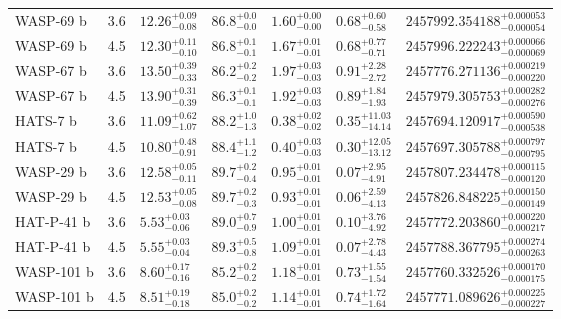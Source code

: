 {\begin{longtable}[h]{lllllll}
WASP-69 b   &               3.6 &  ${12.26}^{+0.09}_{-0.08}$ &  ${86.8}^{+0.0}_{-0.0}$ &  ${1.60}^{+0.00}_{-0.00}$ &    ${0.68}^{+0.60}_{-0.58}$ &  ${2457992.354188}^{+0.000053}_{-0.000054}$ \\
WASP-69 b   &               4.5 &  ${12.30}^{+0.11}_{-0.10}$ &  ${86.8}^{+0.1}_{-0.1}$ &  ${1.67}^{+0.01}_{-0.01}$ &    ${0.68}^{+0.77}_{-0.71}$ &  ${2457996.222243}^{+0.000066}_{-0.000069}$ \\
WASP-67 b   &               3.6 &  ${13.50}^{+0.39}_{-0.33}$ &  ${86.2}^{+0.2}_{-0.2}$ &  ${1.97}^{+0.03}_{-0.03}$ &    ${0.91}^{+2.28}_{-2.72}$ &  ${2457776.271136}^{+0.000219}_{-0.000220}$ \\
WASP-67 b   &               4.5 &  ${13.90}^{+0.31}_{-0.39}$ &  ${86.3}^{+0.1}_{-0.1}$ &  ${1.92}^{+0.03}_{-0.03}$ &    ${0.89}^{+1.84}_{-1.93}$ &  ${2457979.305753}^{+0.000282}_{-0.000276}$ \\
HATS-7 b    &               3.6 &  ${11.09}^{+0.62}_{-1.07}$ &  ${88.2}^{+1.0}_{-1.3}$ &  ${0.38}^{+0.02}_{-0.02}$ &  ${0.35}^{+11.03}_{-14.14}$ &  ${2457694.120917}^{+0.000590}_{-0.000538}$ \\
HATS-7 b    &               4.5 &  ${10.80}^{+0.48}_{-0.91}$ &  ${88.4}^{+1.1}_{-1.2}$ &  ${0.40}^{+0.03}_{-0.03}$ &  ${0.30}^{+12.05}_{-13.12}$ &  ${2457697.305788}^{+0.000797}_{-0.000795}$ \\
WASP-29 b   &               3.6 &  ${12.58}^{+0.05}_{-0.11}$ &  ${89.7}^{+0.2}_{-0.4}$ &  ${0.95}^{+0.01}_{-0.01}$ &    ${0.07}^{+2.95}_{-4.91}$ &  ${2457807.234478}^{+0.000115}_{-0.000120}$ \\
WASP-29 b   &               4.5 &  ${12.53}^{+0.05}_{-0.08}$ &  ${89.7}^{+0.2}_{-0.3}$ &  ${0.93}^{+0.01}_{-0.01}$ &    ${0.06}^{+2.59}_{-4.13}$ &  ${2457826.848225}^{+0.000150}_{-0.000149}$ \\
HAT-P-41 b   &               3.6 &   ${5.53}^{+0.03}_{-0.06}$ &  ${89.0}^{+0.7}_{-0.9}$ &  ${1.00}^{+0.01}_{-0.01}$ &    ${0.10}^{+3.76}_{-4.92}$ &  ${2457772.203860}^{+0.000220}_{-0.000217}$ \\
HAT-P-41 b   &               4.5 &   ${5.55}^{+0.03}_{-0.04}$ &  ${89.3}^{+0.5}_{-0.8}$ &  ${1.09}^{+0.01}_{-0.01}$ &    ${0.07}^{+2.78}_{-4.43}$ &  ${2457788.367795}^{+0.000274}_{-0.000263}$ \\
WASP-101 b  &               3.6 &   ${8.60}^{+0.17}_{-0.16}$ &  ${85.2}^{+0.2}_{-0.2}$ &  ${1.18}^{+0.01}_{-0.01}$ &    ${0.73}^{+1.55}_{-1.54}$ &  ${2457760.332526}^{+0.000170}_{-0.000175}$ \\
WASP-101 b  &               4.5 &   ${8.51}^{+0.19}_{-0.18}$ &  ${85.0}^{+0.2}_{-0.2}$ &  ${1.14}^{+0.01}_{-0.01}$ &    ${0.74}^{+1.72}_{-1.64}$ &  ${2457771.089626}^{+0.000225}_{-0.000227}$ \\

\end{longtable}}
